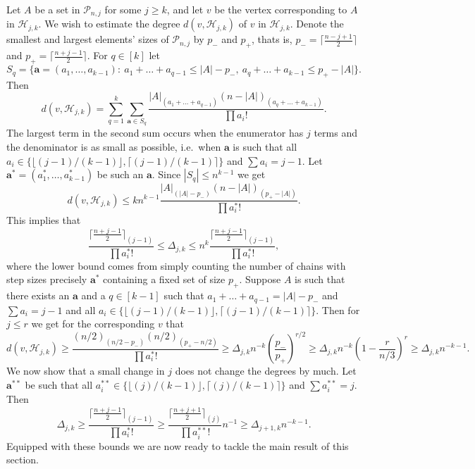 \documentclass[12pt]{article}
\numberwithin{equation}{section}
\def\HH{\mathcal{H}}
\def\P{\mathcal{P}}
\begin{document}
Let $A$ be a set in $\P_{n,j}$ for some $j\geq k$, and let $v$ be the vertex corresponding to $A$ in $\HH_{j,k}$. We wish to estimate the degree $d(v,\HH_{j,k})$ of $v$ in $\HH_{j,k}$. Denote the smallest and largest elements' sizes of $\P_{n,j}$ by $p_-$ and $p_+$, thats is,  $p_-=\lceil \frac{n-j+1}{2}\rceil$ and $p_+= \lceil\frac{n+j-1}{2}\rceil$. For $q\in [k]$ let $$S_q=\{\mathbf{a}=(a_1,\ldots,a_{k-1}):~ a_1+\ldots + a_{q-1}\leq |A|-p_-, ~ a_{q}+\ldots + a_{k-1}\leq p_+-|A|\}. $$ Then
$$d(v,\HH_{j,k})=\sum_{q=1}^k \sum_{\mathbf{a}\in S_q}\frac{|A|_{(a_1+\ldots +a_{q-1})} (n-|A|)_{(a_q+\ldots + a_{k-1})}} {\prod a_i!}.$$
The largest term in the second sum occurs when the enumerator has $j$ terms and the denominator is as small as possible, i.e.~when $\mathbf{a}$ is such that all $a_i\in\{\lfloor (j-1)/(k-1)\rfloor, \lceil (j-1)/(k-1) \rceil\}$ and $\sum a_i=j-1$. Let $\mathbf{a^*}=(a^*_1,\ldots,a^*_{k-1})$ be such an $\mathbf{a}$. Since $|S_q|\leq n^{k-1}$ we get
$$d(v,\HH_{j,k})\leq kn^{k-1} \frac{|A|_{(|A|-p_-)} (n-|A|)_{(p_+-|A|)}}{\prod a^*_i!}.$$
This implies that 
$$\frac{\lceil\frac{n+j-1}{2}\rceil_{(j-1)}}{\prod a^*_i!}\leq\Delta_{j,k}\leq n^k \frac{\lceil\frac{n+j-1}{2}\rceil_{(j-1)}}{\prod a^*_i!},$$
where the lower bound comes from simply counting the number of chains with step sizes precisely $\mathbf{a}^*$ containing a fixed set of size $p_+$.
Suppose $A$ is such that there exists an $\mathbf{a}$ and a $q\in [k-1]$ such that $a_1+\ldots +a_{q-1}=|A|-p_-$ and $\sum a_i = j-1$ and all $a_i\in \{\lfloor (j-1)/(k-1)\rfloor, \lceil (j-1)/(k-1) \rceil\}$. Then for $j\leq r$ we get for the corresponding $v$ that
\begin{equation}\label{degreesarebehaving}
d(v,\HH_{j,k})\geq \frac{(n/2)_{(n/2-p_-)}(n/2)_{(p_+-n/2)}}{\prod a^*_i!}\geq \Delta_{j,k}n^{-k}\left(\frac{p_-}{p_+}\right)^{r/2}\geq \Delta_{j,k}n^{-k}\left(1-\frac{r}{n/3}\right)^r\geq \Delta_{j,k}n^{-k-1}.
\end{equation}
We now show that a small change in $j$ does not change the degrees by much. Let $\mathbf{a}^{**}$ be such that all $a^{**}_i\in\{\lfloor (j)/(k-1)\rfloor, \lceil (j)/(k-1) \rceil\}$ and $\sum a^{**}_i=j$. Then
\begin{equation}\label{degreesarebehaving2}
\Delta_{j,k}\geq \frac{\lceil\frac{n+j-1}{2}\rceil_{(j-1)}}{\prod a^*_i!}\geq \frac{\lceil\frac{n+j+1}{2}\rceil_{(j)}}{\prod a^{**}_i!} n^{-1}\geq \Delta_{j+1,k}n^{-k-1}.
\end{equation}
Equipped with these bounds we are now ready to tackle the main result of this section.
 
\end{document}
